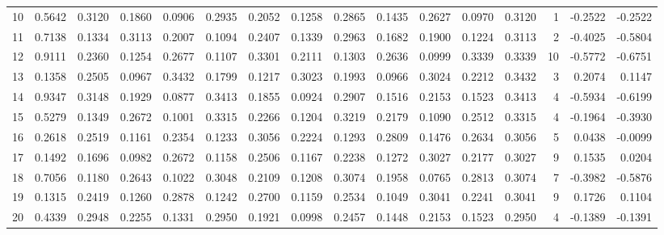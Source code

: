 \begin{tabular}{lrrrrrrrrrrrrrrr}
10  &      0.5642 &  0.3120 &  0.1860 &  0.0906 &  0.2935 &  0.2052 &  0.1258 &  0.2865 &  0.1435 &  0.2627 &   0.0970 &     0.3120 &      1 &                   -0.2522 &                    -0.2522 \\
11  &      0.7138 &  0.1334 &  0.3113 &  0.2007 &  0.1094 &  0.2407 &  0.1339 &  0.2963 &  0.1682 &  0.1900 &   0.1224 &     0.3113 &      2 &                   -0.4025 &                    -0.5804 \\
12  &      0.9111 &  0.2360 &  0.1254 &  0.2677 &  0.1107 &  0.3301 &  0.2111 &  0.1303 &  0.2636 &  0.0999 &   0.3339 &     0.3339 &     10 &                   -0.5772 &                    -0.6751 \\
13  &      0.1358 &  0.2505 &  0.0967 &  0.3432 &  0.1799 &  0.1217 &  0.3023 &  0.1993 &  0.0966 &  0.3024 &   0.2212 &     0.3432 &      3 &                    0.2074 &                     0.1147 \\
14  &      0.9347 &  0.3148 &  0.1929 &  0.0877 &  0.3413 &  0.1855 &  0.0924 &  0.2907 &  0.1516 &  0.2153 &   0.1523 &     0.3413 &      4 &                   -0.5934 &                    -0.6199 \\
15  &      0.5279 &  0.1349 &  0.2672 &  0.1001 &  0.3315 &  0.2266 &  0.1204 &  0.3219 &  0.2179 &  0.1090 &   0.2512 &     0.3315 &      4 &                   -0.1964 &                    -0.3930 \\
16  &      0.2618 &  0.2519 &  0.1161 &  0.2354 &  0.1233 &  0.3056 &  0.2224 &  0.1293 &  0.2809 &  0.1476 &   0.2634 &     0.3056 &      5 &                    0.0438 &                    -0.0099 \\
17  &      0.1492 &  0.1696 &  0.0982 &  0.2672 &  0.1158 &  0.2506 &  0.1167 &  0.2238 &  0.1272 &  0.3027 &   0.2177 &     0.3027 &      9 &                    0.1535 &                     0.0204 \\
18  &      0.7056 &  0.1180 &  0.2643 &  0.1022 &  0.3048 &  0.2109 &  0.1208 &  0.3074 &  0.1958 &  0.0765 &   0.2813 &     0.3074 &      7 &                   -0.3982 &                    -0.5876 \\
19  &      0.1315 &  0.2419 &  0.1260 &  0.2878 &  0.1242 &  0.2700 &  0.1159 &  0.2534 &  0.1049 &  0.3041 &   0.2241 &     0.3041 &      9 &                    0.1726 &                     0.1104 \\
20  &      0.4339 &  0.2948 &  0.2255 &  0.1331 &  0.2950 &  0.1921 &  0.0998 &  0.2457 &  0.1448 &  0.2153 &   0.1523 &     0.2950 &      4 &                   -0.1389 &                    -0.1391 \\

\end{tabular}
